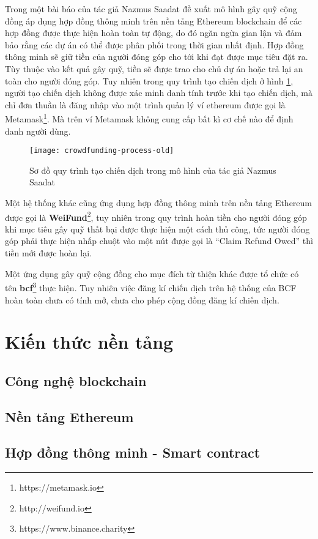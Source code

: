 \documentclass[../main-report.tex]{subfiles}
\begin{document}
Trong một bài báo của tác giả Nazmus Saadat \cite{saadat2019blockchain} đề xuất mô hình gây quỹ cộng đồng áp dụng hợp đồng thông minh trên nền tảng Ethereum \gls{blockchain} để các hợp đồng được thực hiện hoàn toàn tự động, do đó ngăn ngừa gian lận và đảm bảo rằng các dự án có thể được phân phối trong thời gian nhất định. Hợp đồng thông minh sẽ giữ tiền của người đóng góp cho tới khi đạt được mục tiêu đặt ra. Tùy thuộc vào kết quả gây quỹ, tiền sẽ được trao cho chủ dự án hoặc trả lại an toàn cho người đóng góp. Tuy nhiên trong quy trình tạo chiến dịch ở hình \ref{fig:crowdfunding-proccess-old}, người tạo chiến dịch không được xác minh danh tính trước khi tạo chiến dịch, mà chỉ đơn thuần là đăng nhập vào một trình quản lý ví ethereum được gọi là Metamask\footnote{https://metamask.io}. Mà trên ví Metamask không cung cấp bất kì cơ chế nào để định danh người dùng.

\begin{figure}[ht!]
\begin{center}
\label{fig:crowdfunding-proccess-old}
\texttt{[image: crowdfunding-process-old]}
\caption{Sơ đồ quy trình tạo chiến dịch trong mô hình của tác giả Nazmus Saadat}
\end{center}
\end{figure}

Một hệ thống khác cũng ứng dụng hợp đồng thông minh trên nền tảng Ethereum được gọi là \textbf{WeiFund}\footnote{http://weifund.io}, tuy nhiên trong quy trình hoàn tiền cho người đóng góp khi mục tiêu gây quỹ thất bại được thực hiện một cách thủ công, tức người đóng góp phải thực hiện nhấp chuột vào một nút được gọi là ``Claim Refund Owed'' thì tiền mới được hoàn lại.

Một ứng dụng gây quỹ cộng đồng cho mục đích từ thiện khác được tổ chức có tên \textbf{\acrfull{bcf}}\footnote{https://www.binance.charity} thực hiện. Tuy nhiên việc đăng kí chiến dịch trên hệ thống của BCF hoàn toàn chưa có tính mở, chưa cho phép cộng đồng đăng kí chiến dịch.

\section{Kiến thức nền tảng}
\subsection{Công nghệ blockchain}

\subsection{Nền tảng Ethereum}

\subsection{Hợp đồng thông minh - Smart contract}
\end{document}
